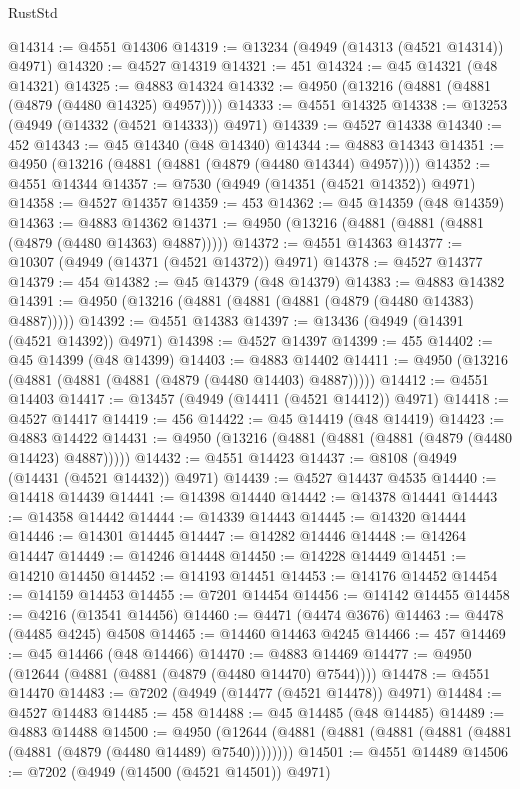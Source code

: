 \begin{lexlean}{RustStd}
\begin{coremodule}
@14314 := @4551 @14306
@14319 := @13234 (@4949 (@14313 (@4521 @14314)) @4971)
@14320 := @4527 @14319
@14321 := 451
@14324 := @45 @14321 (@48 @14321)
@14325 := @4883 @14324
@14332 := @4950 (@13216 (@4881 (@4881 (@4879 (@4480 @14325) @4957))))
@14333 := @4551 @14325
@14338 := @13253 (@4949 (@14332 (@4521 @14333)) @4971)
@14339 := @4527 @14338
@14340 := 452
@14343 := @45 @14340 (@48 @14340)
@14344 := @4883 @14343
@14351 := @4950 (@13216 (@4881 (@4881 (@4879 (@4480 @14344) @4957))))
@14352 := @4551 @14344
@14357 := @7530 (@4949 (@14351 (@4521 @14352)) @4971)
@14358 := @4527 @14357
@14359 := 453
@14362 := @45 @14359 (@48 @14359)
@14363 := @4883 @14362
@14371 := @4950 (@13216 (@4881 (@4881 (@4881 (@4879 (@4480 @14363) @4887)))))
@14372 := @4551 @14363
@14377 := @10307 (@4949 (@14371 (@4521 @14372)) @4971)
@14378 := @4527 @14377
@14379 := 454
@14382 := @45 @14379 (@48 @14379)
@14383 := @4883 @14382
@14391 := @4950 (@13216 (@4881 (@4881 (@4881 (@4879 (@4480 @14383) @4887)))))
@14392 := @4551 @14383
@14397 := @13436 (@4949 (@14391 (@4521 @14392)) @4971)
@14398 := @4527 @14397
@14399 := 455
@14402 := @45 @14399 (@48 @14399)
@14403 := @4883 @14402
@14411 := @4950 (@13216 (@4881 (@4881 (@4881 (@4879 (@4480 @14403) @4887)))))
@14412 := @4551 @14403
@14417 := @13457 (@4949 (@14411 (@4521 @14412)) @4971)
@14418 := @4527 @14417
@14419 := 456
@14422 := @45 @14419 (@48 @14419)
@14423 := @4883 @14422
@14431 := @4950 (@13216 (@4881 (@4881 (@4881 (@4879 (@4480 @14423) @4887)))))
@14432 := @4551 @14423
@14437 := @8108 (@4949 (@14431 (@4521 @14432)) @4971)
@14439 := @4527 @14437 @4535
@14440 := @14418 @14439
@14441 := @14398 @14440
@14442 := @14378 @14441
@14443 := @14358 @14442
@14444 := @14339 @14443
@14445 := @14320 @14444
@14446 := @14301 @14445
@14447 := @14282 @14446
@14448 := @14264 @14447
@14449 := @14246 @14448
@14450 := @14228 @14449
@14451 := @14210 @14450
@14452 := @14193 @14451
@14453 := @14176 @14452
@14454 := @14159 @14453
@14455 := @7201 @14454
@14456 := @14142 @14455
@14458 := @4216 (@13541 @14456)
@14460 := @4471 (@4474 @3676)
@14463 := @4478 (@4485 @4245) @4508
@14465 := @14460 @14463 @4245
@14466 := 457
@14469 := @45 @14466 (@48 @14466)
@14470 := @4883 @14469
@14477 := @4950 (@12644 (@4881 (@4881 (@4879 (@4480 @14470) @7544))))
@14478 := @4551 @14470
@14483 := @7202 (@4949 (@14477 (@4521 @14478)) @4971)
@14484 := @4527 @14483
@14485 := 458
@14488 := @45 @14485 (@48 @14485)
@14489 := @4883 @14488
@14500 := @4950
    (@12644 (@4881 (@4881 (@4881 (@4881 (@4881 (@4881 (@4879 (@4480 @14489) @7540))))))))
@14501 := @4551 @14489
@14506 := @7202 (@4949 (@14500 (@4521 @14501)) @4971)

\end{coremodule}
\end{lexlean}
